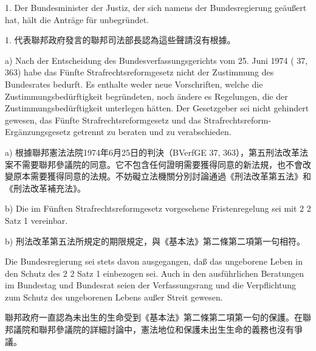 \documentclass[12pt]{article}
\begin{document}
\syncleft
\begin{sourcepara}
1. Der Bundesminister der Justiz, der sich namens der Bundesregierung geäußert hat, hält die Anträge für unbegründet.
\end{sourcepara}
\begin{transpara}
1. 代表聯邦政府發言的聯邦司法部長認為這些聲請沒有根據。
\end{transpara}

\syncleft
\begin{sourcepara}
a) Nach der Entscheidung des Bundesverfassungsgerichts vom 25. Juni 1974 (\abbrBVerfGE{} 37, 363) habe das Fünfte Strafrechtsreformgesetz nicht der Zustimmung des Bundesrates bedurft. Es enthalte weder neue Vorschriften, welche die Zustimmungsbedürftigkeit begründeten, noch ändere es Regelungen, die der Zustimmungsbedürftigkeit unterlegen hätten. Der Gesetzgeber sei nicht gehindert gewesen, das Fünfte Strafrechtsreformgesetz und das Strafrechtsreform-Ergänzungsgesetz getrennt zu beraten und zu verabschieden.
\end{sourcepara}
\begin{transpara}
a) 根據聯邦憲法法院1974年6月25日的判決（BVerfGE 37, 363），第五刑法改革法案不需要聯邦參議院的同意。它不包含任何證明需要獲得同意的新法規，也不會改變原本需要獲得同意的法規。不妨礙立法機關分別討論通過《刑法改革第五法》和《刑法改革補充法》。
\end{transpara}

\syncleft
\begin{sourcepara}
b) Die im Fünften Strafrechtsreformgesetz vorgesehene Fristenregelung sei mit \abbrArt{} 2 \abbrAbs{} 2 Satz 1 \abbrGG{}\ggfnArtTwoTwoOneDE{} vereinbar.
\end{sourcepara}
\begin{transpara}
b) 刑法改革第五法所規定的期限規定，與《基本法》第二條第二項第一句\ggfnArtTwoTwoOneZH{}相符。
\end{transpara}

\syncleft
\begin{sourcepara}
Die Bundesregierung sei stets davon ausgegangen, daß das ungeborene Leben in den Schutz des \abbrArt{} 2 \abbrAbs{} 2 Satz 1 \abbrGG{}\ggfnArtTwoTwoOneDE{} einbezogen sei. Auch in den ausführlichen Beratungen im Bundestag und Bundesrat seien der Verfassungsrang und die Verpflichtung zum Schutz des ungeborenen Lebens außer Streit gewesen.
\end{sourcepara}
\begin{transpara}
聯邦政府一直認為未出生的生命受到《基本法》第二條第二項第一句\ggfnArtTwoTwoOneZH{}的保護。在聯邦議院和聯邦參議院的詳細討論中，憲法地位和保護未出生生命的義務也沒有爭議。
\end{transpara}
\end{document}
